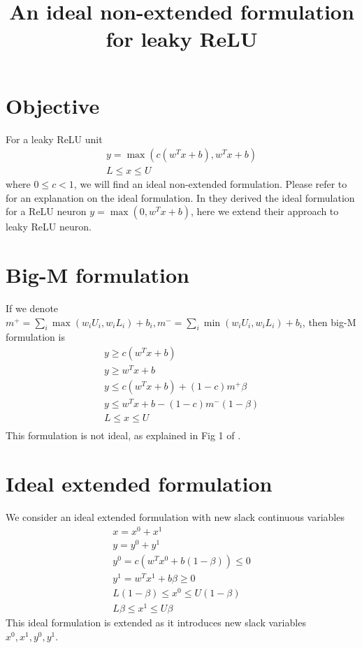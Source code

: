 \documentclass{article}
\title{An ideal non-extended formulation for leaky ReLU}
\begin{document}
\maketitle
\section{Objective}
For a leaky ReLU unit
\begin{subequations}
\begin{align}
	y = \max(c(w^Tx+b), w^Tx+b)\\
	L \le x \le U
\end{align}
\end{subequations}
where $0\le c < 1$, we will find an ideal non-extended formulation. Please refer to \cite{Anderson2020} for an explanation on the ideal formulation. In \cite{Anderson2020} they derived the ideal formulation for a ReLU neuron $y = \max(0, w^Tx+b)$, here we extend their approach to leaky ReLU neuron.

\section{Big-M formulation}
If we denote $m^+ = \sum_i \max(w_iU_i, w_iL_i) + b_i, m^- = \sum_i \min(w_iU_i, w_iL_i) + b_i$, then big-M formulation is
\begin{subequations}
\begin{align}
	y \ge c(w^Tx+b)\\
	y \ge w^Tx+b\\
    y \le c(w^Tx+b) + (1-c)m^+\beta\\
    y \le w^Tx+b - (1-c)m^-(1-\beta)\\
    L \le x \le U\\
\end{align}
\end{subequations}
This formulation is not ideal, as explained in Fig 1 of \cite{Anderson2020}.

\section{Ideal extended formulation}
We consider an ideal extended formulation with new slack continuous variables
\begin{subequations}
\begin{align}
	x = x^0 + x^1\\
	y = y^0 + y^1\\
	y^0 = c(w^Tx^0 + b(1-\beta)) \le 0\\
	y^1 = w^Tx^1 + b\beta\ge 0\\
	L(1-\beta) \le x^0 \le U(1-\beta)\\
	L\beta \le x^1 \le U\beta
\end{align}
\end{subequations}
This ideal formulation is extended as it introduces new slack variables $x^0, x^1, y^0, y^1$.
\end{document}
